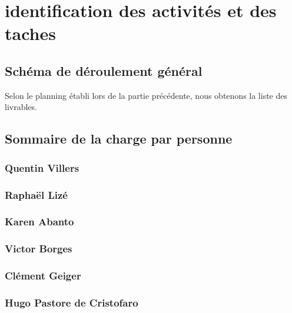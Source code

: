 \section{identification des activités et des taches}

\subsection{Schéma de déroulement général}

Selon le planning établi lors de la partie précédente, nous obtenons la liste des livrables. 



\subsection{Sommaire de la charge par personne}


\subsubsection{Quentin Villers}
\subsubsection{Raphaël Lizé}
\subsubsection{Karen Abanto}
\subsubsection{Victor Borges}
\subsubsection{Clément Geiger}
\subsubsection{Hugo Pastore de Cristofaro}


